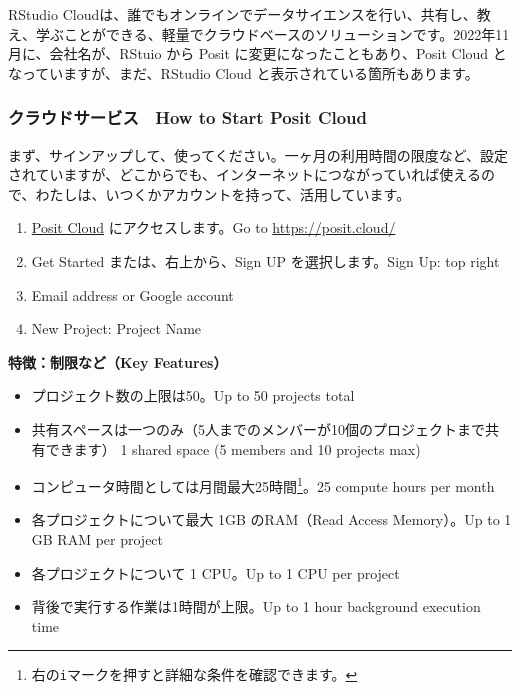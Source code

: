 \documentclass[
]{bxjsbook}
\providecommand{\tightlist}{%
  \setlength{\itemsep}{0pt}\setlength{\parskip}{0pt}}
\theoremstyle{definition}
\theoremstyle{definition}
\theoremstyle{definition}
\theoremstyle{definition}
\theoremstyle{remark}
\begin{document}
RStudio Cloudは、誰でもオンラインでデータサイエンスを行い、共有し、教え、学ぶことができる、軽量でクラウドベースのソリューションです。2022年11月に、会社名が、RStuio から Posit に変更になったこともあり、Posit Cloud となっていますが、まだ、RStudio Cloud と表示されている箇所もあります。

\hypertarget{ux30afux30e9ux30a6ux30c9ux30b5ux30fcux30d3ux30b9-how-to-start-posit-cloud}{%
\subsubsection{クラウドサービス　How to Start Posit Cloud}\label{ux30afux30e9ux30a6ux30c9ux30b5ux30fcux30d3ux30b9-how-to-start-posit-cloud}}

まず、サインアップして、使ってください。一ヶ月の利用時間の限度など、設定されていますが、どこからでも、インターネットにつながっていれば使えるので、わたしは、いつくかアカウントを持って、活用しています。

\begin{enumerate}
\def\labelenumi{\arabic{enumi}.}
\tightlist
\item
  \href{https://posit.cloud/}{Posit Cloud} にアクセスします。Go to \url{https://posit.cloud/}
\item
  Get Started または、右上から、Sign UP を選択します。Sign Up: top right
\item
  Email address or Google account
\item
  New Project: Project Name
\end{enumerate}

\textbf{特徴：制限など（Key Features）}

\begin{itemize}
\tightlist
\item
  プロジェクト数の上限は50。Up to 50 projects total
\item
  共有スペースは一つのみ（5人までのメンバーが10個のプロジェクトまで共有できます） 1 shared space (5 members and 10 projects max)
\item
  コンピュータ時間としては月間最大25時間\footnote{右の\texttt{i}マークを押すと詳細な条件を確認できます。}。25 compute hours per month
\item
  各プロジェクトについて最大 1GB のRAM（Read Access Memory）。Up to 1 GB RAM per project
\item
  各プロジェクトについて 1 CPU。Up to 1 CPU per project
\item
  背後で実行する作業は1時間が上限。Up to 1 hour background execution time
\end{itemize}
\end{document}
